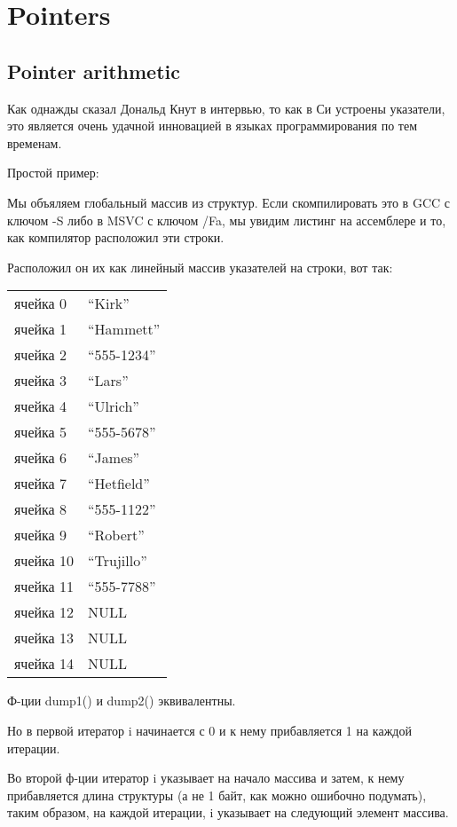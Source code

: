 ﻿\section{Pointers}

\subsection{Pointer arithmetic}

Как однажды сказал Дональд Кнут в интервью\cite{KnuthInterview1993}, то как в Си устроены указатели, это является
очень удачной инновацией в языках программирования по тем временам.

Простой пример:



Мы объяляем глобальный массив из структур. Если скомпилировать это в GCC с ключом -S либо в MSVC с ключом
/Fa, мы увидим листинг на ассемблере и то, как компилятор расположил эти строки. 

Расположил он их как линейный массив указателей на строки, вот так:

\begin{center}
\begin{tabular}{ | l | l | }
\hline
  ячейка 0    & ``Kirk'' \\
  ячейка 1    & ``Hammett'' \\
  ячейка 2    & ``555-1234'' \\
  ячейка 3    & ``Lars'' \\
  ячейка 4    & ``Ulrich'' \\
  ячейка 5    & ``555-5678'' \\
  ячейка 6    & ``James'' \\
  ячейка 7    & ``Hetfield'' \\
  ячейка 8    & ``555-1122'' \\
  ячейка 9    & ``Robert'' \\
  ячейка 10   & ``Trujillo'' \\
  ячейка 11   & ``555-7788'' \\
  ячейка 12   & NULL \\
  ячейка 13   & NULL \\
  ячейка 14   & NULL \\
\hline
\end{tabular}
\end{center}

Ф-ции dump1() и dump2() эквивалентны.

Но в первой итератор i начинается с 0 и к нему прибавляется 1 на каждой итерации.

Во второй ф-ции итератор i указывает на начало массива и затем, к нему прибавляется длина структуры 
(а не 1 байт, как можно ошибочно подумать),
таким образом, на каждой итерации, i указывает на следующий элемент массива.

